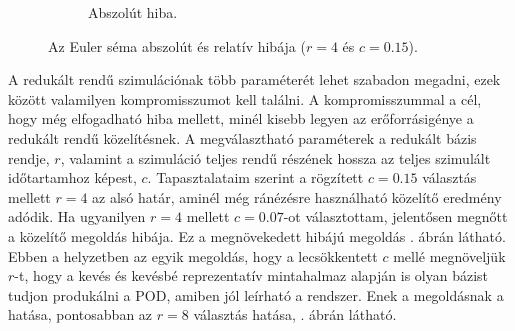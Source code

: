 \begin{figure}[h]
\begin{subfigure}{0.48\textwidth}
                \caption{Abszolút hiba.}
            \end{subfigure}
            \caption{Az Euler séma abszolút és relatív hibája ($r=4$ és $c=0.15$).}
            \label{fig:hiba}
        \end{figure}
        A redukált rendű szimulációnak több paraméterét lehet szabadon megadni, ezek között valamilyen kompromisszumot kell találni. A kompromisszummal a cél, hogy még elfogadható hiba mellett, minél kisebb legyen az erőforrásigénye a redukált rendű közelítésnek. A megválasztható paraméterek a redukált bázis rendje, $r$, valamint a szimuláció teljes rendű részének hossza az teljes szimulált időtartamhoz képest, $c$. Tapasztalataim szerint a rögzített $c=0.15$ választás mellett $r=4$ az alsó határ, aminél még ránézésre használható közelítő eredmény adódik. Ha ugyanilyen $r=4$ mellett $c=0.07$-ot választottam, jelentősen megnőtt a közelítő megoldás hibája. Ez a megnövekedett hibájú megoldás . ábrán látható. Ebben a helyzetben az egyik megoldás, hogy a lecsökkentett $c$ mellé megnöveljük $r$-t, hogy a kevés és kevésbé reprezentatív mintahalmaz alapján is olyan bázist tudjon produkálni a POD, amiben jól leírható a rendszer. Enek a megoldásnak a hatása, pontosabban az $r=8$ választás hatása, . ábrán látható.
